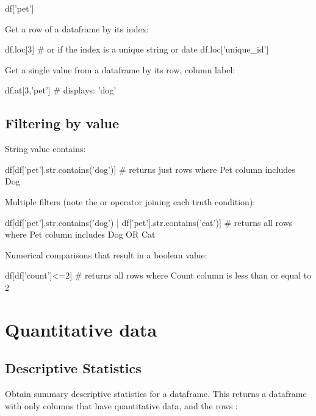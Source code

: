 \begin{pycode}
    df['pet']
\end{pycode}

Get a row of a dataframe by its index:

\begin{pycode}
    df.loc[3]
    # or if the index is a unique string or date
    df.loc['unique_id']
\end{pycode}

Get a single value from a dataframe by its row, column label:

\begin{pycode}
    df.at[3,'pet']
    # displays: 'dog'
\end{pycode}

\subsection{Filtering by value}

String value contains:

\begin{pycode}
    df[df['pet'].str.contains('dog')]
    # returns just rows where Pet column includes Dog
\end{pycode}

Multiple filters (note the or \code{|} operator joining each truth condition):

\begin{pycode}
    df[df['pet'].str.contains('dog') | df['pet'].str.contains('cat')]
    # returns all rows where Pet column includes Dog OR Cat
\end{pycode}

Numerical comparisons that result in a boolean value:

\begin{pycode}
    df[df['count']<=2]
    # returns all rows where Count column is less than or equal to 2
\end{pycode}


\section{Quantitative data}

\subsection{Descriptive Statistics}

Obtain summary descriptive statistics for a dataframe. This returns a dataframe  with only columns that have quantitative data, and the rows :

